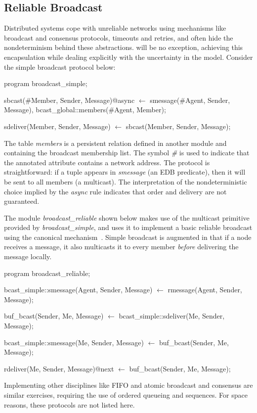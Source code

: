 \subsection{Reliable Broadcast}

Distributed systems cope with unreliable networks using mechanisms like broadcast and consensus protocols, 
timeouts and retries, and often hide the nondeterminism behind these abstractions.  \lang will be no exception,
achieving this encapsulation while dealing explicitly with the uncertainty in the model.  Consider the simple
broadcast protocol below:

\begin{Dedalus}

program broadcast_simple;

sbcast(#Member, Sender, Message)@async \(\leftarrow\)
    smessage(#Agent, Sender, Message),
    bcast_global::members(#Agent, Member);

sdeliver(Member, Sender, Message) \(\leftarrow\)
    sbcast(Member, Sender, Message);

\end{Dedalus}

The table \emph{members} is a persistent relation defined in another module and containing the broadcast 
membership list.  The symbol \emph{\#} is used to indicate that the annotated attribute contains a network
address.  The protocol is straightforward: if a tuple appears in \emph{smessage} (an EDB predicate), then
it will be sent to all members (a multicast).  The interpretation of the nondeterministic choice implied by the
\emph{async} rule indicates that order and delivery are not guaranteed.

The module \emph{broadcast\_reliable} shown below makes use of the multicast primitive provided by \emph{broadcast\_simple}, and
uses it to implement a basic reliable broadcast using the canonical mechanism~\cite{mullender}. 
Simple broadcast is augmented in that if a node receives a message, it 
also multicasts it to every member \emph{before} delivering the message locally.  


\begin{Dedalus}
program broadcast_reliable;

bcast_simple::smessage(Agent, Sender, Message)  \(\leftarrow\)
    rmessage(Agent, Sender, Message);

buf_bcast(Sender, Me, Message)  \(\leftarrow\)
    bcast_simple::sdeliver(Me, Sender, Message);

bcast_simple::smessage(Me, Sender, Message)  \(\leftarrow\)
    buf_bcast(Sender, Me, Message);

rdeliver(Me, Sender, Message)@next  \(\leftarrow\)
    buf_bcast(Sender, Me, Message);

\end{Dedalus}


Implementing other disciplines like FIFO and atomic broadcast and consensus are similar exercises, requiring the use of
ordered queueing and sequences.  For space reasons, these protocols are not listed here.